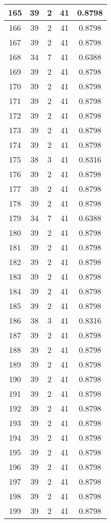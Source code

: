 \documentclass[letterpaper, 12pt]{article}
\begin{document}
\begin{longtable}{|c|c|c|c|c|}
\hline
165 & 39 & 2 & 41 & 0.8798 \\
\hline
166 & 39 & 2 & 41 & 0.8798 \\
\hline
167 & 39 & 2 & 41 & 0.8798 \\
\hline
168 & 34 & 7 & 41 & 0.6388 \\
\hline
169 & 39 & 2 & 41 & 0.8798 \\
\hline
170 & 39 & 2 & 41 & 0.8798 \\
\hline
171 & 39 & 2 & 41 & 0.8798 \\
\hline
172 & 39 & 2 & 41 & 0.8798 \\
\hline
173 & 39 & 2 & 41 & 0.8798 \\
\hline
174 & 39 & 2 & 41 & 0.8798 \\
\hline
175 & 38 & 3 & 41 & 0.8316 \\
\hline
176 & 39 & 2 & 41 & 0.8798 \\
\hline
177 & 39 & 2 & 41 & 0.8798 \\
\hline
178 & 39 & 2 & 41 & 0.8798 \\
\hline
179 & 34 & 7 & 41 & 0.6388 \\
\hline
180 & 39 & 2 & 41 & 0.8798 \\
\hline
181 & 39 & 2 & 41 & 0.8798 \\
\hline
182 & 39 & 2 & 41 & 0.8798 \\
\hline
183 & 39 & 2 & 41 & 0.8798 \\
\hline
184 & 39 & 2 & 41 & 0.8798 \\
\hline
185 & 39 & 2 & 41 & 0.8798 \\
\hline
186 & 38 & 3 & 41 & 0.8316 \\
\hline
187 & 39 & 2 & 41 & 0.8798 \\
\hline
188 & 39 & 2 & 41 & 0.8798 \\
\hline
189 & 39 & 2 & 41 & 0.8798 \\
\hline
190 & 39 & 2 & 41 & 0.8798 \\
\hline
191 & 39 & 2 & 41 & 0.8798 \\
\hline
192 & 39 & 2 & 41 & 0.8798 \\
\hline
193 & 39 & 2 & 41 & 0.8798 \\
\hline
194 & 39 & 2 & 41 & 0.8798 \\
\hline
195 & 39 & 2 & 41 & 0.8798 \\
\hline
196 & 39 & 2 & 41 & 0.8798 \\
\hline
197 & 39 & 2 & 41 & 0.8798 \\
\hline
198 & 39 & 2 & 41 & 0.8798 \\
\hline
199 & 39 & 2 & 41 & 0.8798 \\
\hline
\end{longtable}
\end{document}
